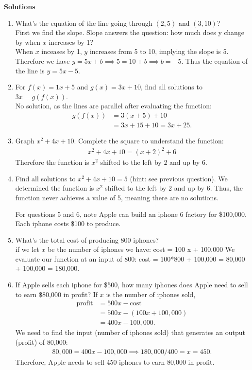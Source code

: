 \documentclass[a4paper, 12pt]{article}
\newcommand{\bt}[1]{\textbf{#1}} %
\newcommand{\eq}[1]{\begin{align*}#1\end{align*}} %
\renewcommand{\eq}[1]{\begin{align*}#1\end{align*}} %
\newcommand{\green}[1]{\textcolor{javagreen}{#1}} %
\begin{document}
\newpage
\centerline{\bt{Solutions}}
\begin{enumerate}
    \item What's the equation of the line going through $(2, 5)$ and $(3, 10)$?\\
    \green{
    First we find the slope. Slope answers the question: how much does y change by when $x$ increases by 1?\\
    When $x$ inceases by 1, $y$ increases from 5 to 10, implying the slope is 5.
    Therefore we have $y = 5x + b \implies 5 = 10 + b \implies b = -5$. Thus the equation of the line is $y = 5x -5$.
    }

    \item For $f(x) = 1x + 5$ and $g(x) = 3x + 10$, find all solutions to $3x = g(f(x))$. \\
    \green{
    No solution, as the lines are parallel after evaluating the function:
    \eq{
    g(f(x)) &= 3(x+5) +10  \\
    & = 3x + 15 + 10  = 3x + 25.}
    }
    \item Graph $x^2 + 4x + 10$.
    \green{
    Complete the square to understand the function:
    \eq{
    x^2 + 4x + 10 = (x+2)^2 + 6
    }
    Therefore the function is $x^2$ shifted to the left by 2 and up by 6.
    }

    \item Find all solutions to $x^2 + 4x + 10 = 5$ (hint: see previous question).
    \green{
    We determined the function is $x^2$ shifted to the left by 2 and up by 6. Thus, the function never achieves a value of 5, meaning there are no solutions.
    }


   For questions 5 and 6, note Apple can build an iphone 6 factory for \$100,000. Each iphone costs \$100 to produce. 
    \item What's the total cost of producing 800 iphones? \\
    \green{if we let $x$ be the number of iphones we have: 
    cost = 100 x + 100,000
    We evaluate our function at an input of 800: 
    cost = 100*800 + 100,000 = 80,000 + 100,000 = 180,000.
    }

    \item If Apple sells each iphone for \$500, how many iphones does Apple need to sell to earn \$80,000 in profit?
    \green{
    If $x$ is the number of iphones sold, 
    \eq{
    \text{profit} &= 500 x - \text{cost } \\
    & = 500x - (100x + 100,000) \\
    & = 400x - 100,000.
    }
    We need to find the input (number of iphones sold) that generates an output (profit) of 80,000: 
    \eq{
    80,000 = 400x - 100,000 \implies 180,000/400 = x = 450.
    }
    Therefore, Apple needs to sell 450 iphones to earn 80,000 in profit. 
    }
\end{enumerate}
\end{document}
